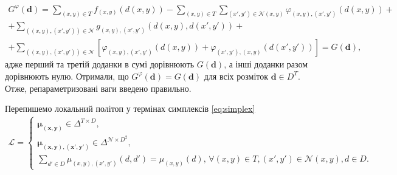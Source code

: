 \begin{equation*}
\begin{gathered}
    G^{\varphi} \left( \pmb{d} \right)
    = \sum \limits_{\left(x, y \right) \in T}
        f_{\left(x, y \right)} \left(d \left(x, y \right) \right)
    - \sum \limits_{\left(x, y \right) \in T}
        \sum \limits_{\left(x', y' \right) \in \mathcal{N} \left(x, y \right)}
            \varphi_{\left(x, y \right), \left(x', y' \right)} \left(
                d \left(x, y \right)
            \right) + \\
    + \sum \limits_{\left( \left(x, y \right), \left( x', y' \right) \right) \in \mathcal{N}}
        g_{\left(x, y \right), \left(x', y' \right)} \left(
            d \left(x, y \right), d \left(x', y' \right)
        \right) + \\
    + \sum \limits_{\left( \left(x, y \right), \left( x', y' \right) \right) \in \mathcal{N}}
        \left[
            \varphi_{\left(x, y \right), \left(x', y' \right)} \left(
                d \left(x, y \right)
            \right)
            + \varphi_{\left(x', y' \right), \left(x, y \right)} \left(
                d \left(x', y' \right)
            \right)
        \right] = G \left(\pmb{d} \right),
\end{gathered}
\end{equation*}
адже перший та третій доданки в сумі дорівнюють
$G \left( \pmb{d} \right)$,
а інші доданки разом дорівнюють нулю.
Отримали, що
$G^{\varphi} \left(\pmb{d} \right)
    = G \left(\pmb{d} \right)$
для всіх розміток $\pmb{d} \in D^T$.
Отже, репараметризовані ваги введено правильно.

Перепишемо локальний політоп у термінах симплексів \eqref{eq:simplex}
\begin{equation*}
\begin{gathered}
    \mathcal{L} =
    \begin{cases}
        \pmb{\mu_{\left(x, y \right)}} \in \Delta^{T \times D}, \\
        \pmb{\mu_{ \left(x, y \right), \left(x', y' \right)}} \in
            \Delta^{\mathcal{N} \times D^2}, \\
        \sum \limits_{d' \in D}
            \mu_{\left(x, y \right), \left(x', y' \right)} \left(d, d' \right) =
            \mu_{\left(x, y \right)} \left(d \right), \,
        \forall \left(x, y \right) \in T,
        \left(x', y' \right) \in \mathcal{N} \left(x, y \right),
        d \in D.
    \end{cases}
\end{gathered}
\end{equation*}

